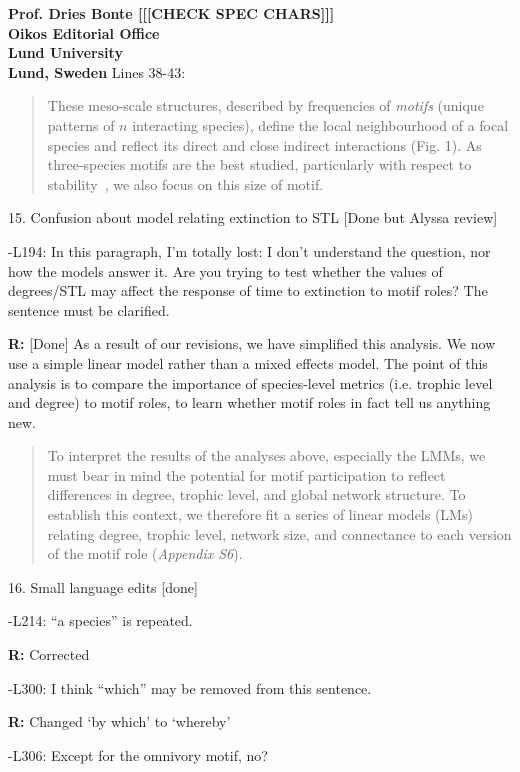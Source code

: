 \documentclass[12pt]{letter}
\begin{document}
\begin{letter}{\bf Prof. Dries Bonte [[[CHECK SPEC CHARS]]]\\
Oikos Editorial Office \\
Lund University \\
Lund, Sweden}
        Lines 38-43:
        
        \begin{quotation}
    	These meso-scale structures, described by frequencies of \emph{motifs} (unique patterns of $n$ interacting species), define the local neighbourhood of a focal species and reflect its direct and close indirect interactions (Fig. 1).
        As three-species motifs are the best studied, particularly with respect to stability~\citep{Stouffer2007,Borrelli2015,Borrelli2015a,Gilling2019}, we also focus on this size of motif.
        \end{quotation}



    15. Confusion about model relating extinction to STL [Done but Alyssa review]

      -L194: In this paragraph, I’m totally lost: I don’t understand the question, nor how the models answer it. Are you trying to test whether the values of degrees/STL may affect the response of time to extinction to motif roles? The sentence must be clarified.

      \textbf{R:} [Done]
      As a result of our revisions, we have simplified this analysis. We now use a simple linear model rather than a mixed effects model. The point of this analysis is to compare the importance of species-level metrics (i.e. trophic level and degree) to motif roles, to learn whether motif roles in fact tell us anything new.
      
      \begin{quotation}
      To interpret the results of the analyses above, especially the LMMs, we must bear in mind the potential for motif participation to reflect differences in degree, trophic level, and global network structure. 
      To establish this context, we therefore fit a series of linear models (LMs) relating degree, trophic level, network size, and connectance to each version of the motif role (\emph{Appendix S6}). 
      \end{quotation}
      


    16. Small language edits [done]

      -L214: ``a species'' is repeated.

        \textbf{R:} Corrected

      -L300: I think ``which'' may be removed from this sentence.

        \textbf{R:} Changed `by which' to `whereby'

      -L306: Except for the omnivory motif, no?


\end{letter}
\end{document}
